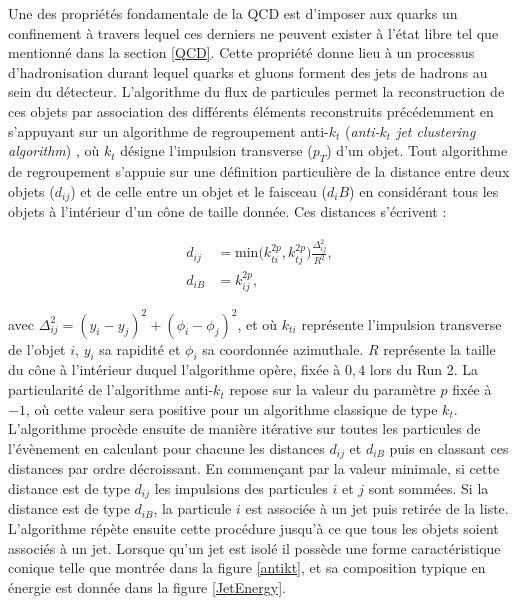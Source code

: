 Une des propriétés fondamentale de la QCD est d'imposer aux quarks un confinement à travers lequel ces derniers ne peuvent exister à l'état libre tel que mentionné dans la section \ref{QCD}. Cette propriété donne lieu à un processus d'hadronisation durant lequel quarks et gluons forment des jets de hadrons au sein du détecteur. L'algorithme du flux de particules permet la reconstruction de ces objets par association des différents éléments reconstruits précédemment en s'appuyant sur un algorithme de regroupement anti-$k_t$ (\textit{anti-$k_t$ jet clustering algorithm}) \cite{antikt}, où $k_t$ désigne l'impulsion transverse ($p_T$) d'un objet. Tout algorithme de regroupement s'appuie sur une définition particulière de la distance entre deux objets ($d_{ij}$) et de celle entre un objet et le faisceau ($d_iB$) en considérant tous les objets à l'intérieur d'un cône de taille donnée. Ces distances s'écrivent :

\begin{align}
    d_{ij} & = \mbox{min}\bigl(k_{ti}^{2p},k_{tj}^{2p}\bigr)\frac{\Delta_{ij}^2}{R^2}, \\
    d_{iB} & = k_{ij}^{2p},
\end{align}

avec $\Delta^2_{ij}=(y_i-y_j)^2+(\phi_i-\phi_j)^2$, et où $k_{ti}$ représente l'impulsion transverse de l'objet $i$, $y_i$ sa rapidité et $\phi_i$ sa coordonnée azimuthale. $R$ représente la taille du cône à l'intérieur duquel l'algorithme opère, fixée à $0,4$ lors du Run 2. La particularité de l'algorithme anti-$k_t$ repose sur la valeur du paramètre $p$ fixée à $-1$, où cette valeur sera positive pour un algorithme classique de type $k_t$. L'algorithme procède ensuite de manière itérative sur toutes les particules de l'évènement en calculant pour chacune les distances $d_{ij}$ et $d_{iB}$ puis en classant ces distances par ordre décroissant. En commençant par la valeur minimale, si cette distance est de type $d_{ij}$ les impulsions des particules $i$ et $j$ sont sommées. Si la distance est de type $d_{iB}$, la particule $i$ est associée à un jet puis retirée de la liste. L'algorithme répète ensuite cette procédure jusqu'à ce que tous les objets soient associés à un jet. Lorsque qu'un jet est isolé il possède une forme caractéristique conique telle que montrée dans la figure \ref{antikt}, et sa composition typique en énergie est donnée dans la figure \ref{JetEnergy}. \\

